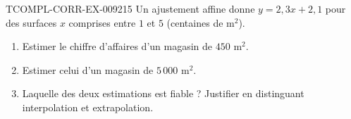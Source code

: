 \begin{exercice}{TCOMPL-CORR-EX-009}{2}{15}
Un ajustement affine donne $y=2{,}3x+2{,}1$ pour des surfaces $x$ comprises
entre $1$ et $5$ (centaines de m$^2$).
\begin{enumerate}
  \item Estimer le chiffre d'affaires d'un magasin de $450$ m$^2$.
  \item Estimer celui d'un magasin de $5\,000$ m$^2$.
  \item Laquelle des deux estimations est fiable ? Justifier en distinguant
        interpolation et extrapolation.
\end{enumerate}
\end{exercice}
